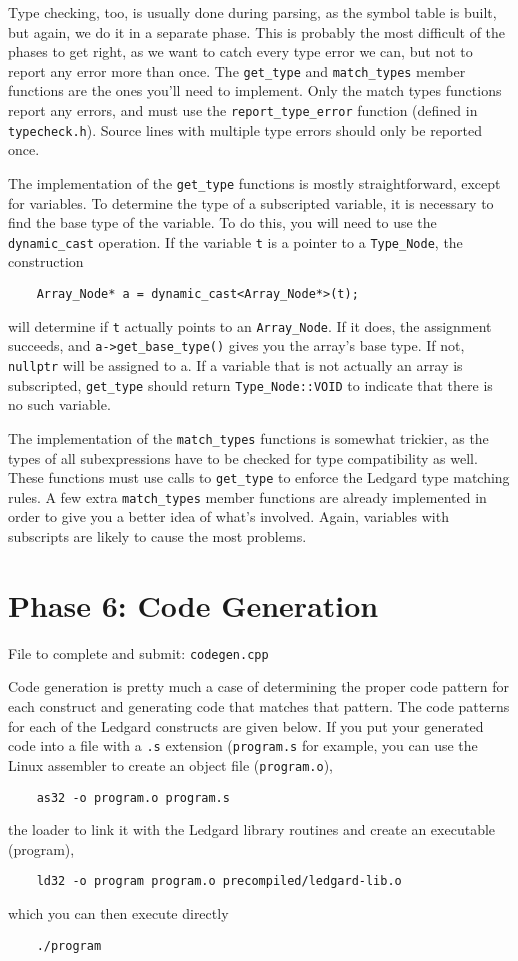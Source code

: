 \documentclass{article}
\begin{document}
Type checking, too, is usually done during parsing, as the symbol
table is built, but again, we do it in a separate phase. This is
probably the most difficult of the phases to get right, as we want to
catch every type error we can, but not to report any error more than
once. The \texttt{get\_type} and \texttt{match\_types} member
functions are the ones you'll need to implement. Only the match types
functions report any errors, and must use the
\texttt{report\_type\_error} function (defined in \texttt{typecheck.h}).
Source lines with multiple type errors should only be reported once.

The implementation of the \texttt{get\_type} functions is mostly
straightforward, except for variables.  To determine the type of
a subscripted variable, it is necessary to find the base type of the
variable.  To do this, you will need to use the \texttt{dynamic\_cast}
operation. If the variable \texttt{t} is a pointer to
a \texttt{Type\_Node}, the construction
\begin{verbatim}
    Array_Node* a = dynamic_cast<Array_Node*>(t);
\end{verbatim}
will determine if \texttt{t} actually points to an
\texttt{Array\_Node}. If it does, the assignment succeeds, and
\texttt{a->get\_base\_type()} gives you the array's base type. If not,
\texttt{nullptr} will be assigned to a. If a variable that is not
actually an array is subscripted, \texttt{get\_type} should return
\texttt{Type\_Node::VOID} to indicate that there is no such variable.

The implementation of the \texttt{match\_types} functions is somewhat
trickier, as the types of all subexpressions have to be checked for
type compatibility as well. These functions must use calls to
\texttt{get\_type} to enforce the Ledgard type matching rules. A few
extra \texttt{match\_types} member functions are already implemented
in order to give you a better idea of what's involved. Again,
variables with subscripts are likely to cause the most problems.  

\section{Phase 6: Code Generation}
File to complete and submit: \texttt{codegen.cpp}

Code generation is pretty much a case of determining the proper code
pattern for each construct and generating code that matches that
pattern. The code patterns for each of the Ledgard constructs are
given below. If you put your generated code into a file with
a \texttt{.s} extension (\texttt{program.s} for example, you can use
the Linux assembler to create an object file (\texttt{program.o}),
\begin{verbatim}
    as32 -o program.o program.s
\end{verbatim}
the loader to link it with the Ledgard library routines and create an
executable (program), 
\begin{verbatim}
    ld32 -o program program.o precompiled/ledgard-lib.o
\end{verbatim}
which you can then execute directly
\begin{verbatim}
    ./program
\end{verbatim}
\end{document}
